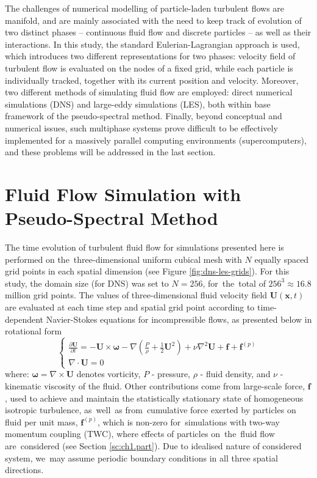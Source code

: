 \documentclass{pracamgren}
\begin{document}
The challenges of numerical modelling of particle-laden turbulent flows are manifold, and are mainly associated with the need to keep track of evolution of two distinct phases -- continuous fluid flow and discrete particles -- as well as their interactions.
In this study, the standard Eulerian-Lagrangian approach is used, which introduces two different representations for two phases: velocity field of turbulent flow is evaluated on the nodes of a fixed grid, while each particle is individually tracked, together with its current position and velocity.
Moreover, two different methods of simulating fluid flow are employed: direct numerical simulations (DNS) and large-eddy simulations (LES), both within base framework of the pseudo-spectral method.
Finally, beyond conceptual and numerical issues, such multiphase systems prove difficult to be effectively implemented for a massively parallel computing environments (supercomputers), and these problems will be addressed in the last section.


\section{Fluid Flow Simulation with Pseudo-Spectral Method}
\label{sc:ch1.pspec}

The time evolution of turbulent fluid flow for simulations presented here is performed on the~three-dimensional uniform cubical mesh with $N$ equally spaced grid points in each spatial dimension (see Figure \ref{fig:dns-les-grids}).
For this study, the domain size (for DNS) was set to $N=256$, for~the~total of $256^3 \approx 16.8$ million grid points.
The values of three-dimensional fluid velocity field $\mathbf{U}(\mathbf{x}, t)$ are evaluated at each time step and spatial grid point according to time-dependent Navier-Stokes equations for incompressible flows, as presented below in rotational form
\begin{equation}
  \left\{
  \begin{array}{ll}
  \frac{\partial \mathbf{U}}{\partial t} = - \mathbf{U} \times \boldsymbol{\omega} - \nabla \left( \frac{P}{\rho} + \frac{1}{2} \mathbf{U}^2 \right) + \nu \nabla^{2} \mathbf{U} + \mathbf{f} + \mathbf{f}^{(p)}\\
  \nabla \cdot \mathbf{U} = 0
  \end{array}
  \right.
  \label{eqn:n-s}
\end{equation}
where: $\boldsymbol{\omega} = \nabla \times \mathbf{U}$ denotes vorticity, $P$ - pressure, $\rho$ - fluid density, and $\nu$ - kinematic viscosity of the fluid.
Other contributions come from large-scale force, $\mathbf{f}$, used to achieve and maintain the statistically stationary state of homogeneous isotropic turbulence, as~well~as from~cumulative force exerted by particles on fluid per unit mass, $\mathbf{f}^{(p)}$, which is non-zero for~simulations with two-way momentum coupling (TWC), where effects of particles on~the~fluid flow are~considered (see Section \ref{sc:ch1.part}).
Due to idealised nature of considered system, we~may assume periodic boundary conditions in all three spatial directions.
\end{document}
